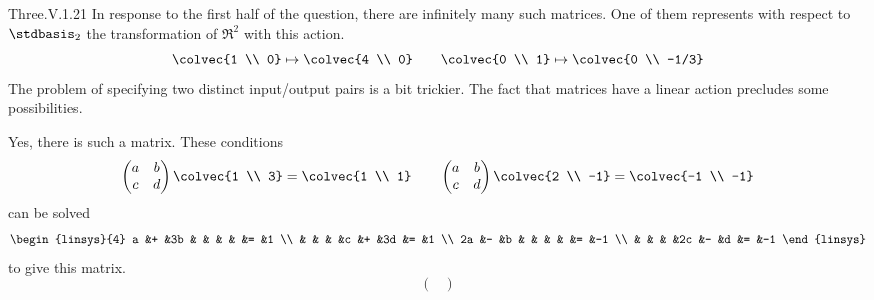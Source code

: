 \begin{ans}{Three.V.1.21}
      In response to the first half of the question,
      there are infinitely many such matrices.
      One of them  represents with respect to
      \( \stdbasis_2 \) the transformation of \( \Re^2 \) with this action.
      \begin{equation*}
        \colvec{1 \\ 0}\mapsto\colvec{4 \\ 0}
        \qquad
        \colvec{0 \\ 1}\mapsto\colvec{0 \\ -1/3}
      \end{equation*}
     The problem of specifying two distinct input/output pairs is a bit
     trickier.
     The fact that matrices have a linear action precludes some possibilities.
     \begin{exparts}
       \partsitem Yes, there is such a matrix.
         These conditions
         \begin{equation*}
           \begin{pmatrix}
             a  &b  \\
             c  &d
           \end{pmatrix}
           \colvec{1 \\ 3}
           =
           \colvec{1 \\ 1}
           \qquad
           \begin{pmatrix}
             a  &b  \\
             c  &d
           \end{pmatrix}
           \colvec{2 \\ -1}
           =
           \colvec{-1 \\ -1}
         \end{equation*}
         can be solved
         \begin{equation*}
           \begin{linsys}{4}
             a  &+  &3b  &   &   &   &   &=  &1  \\
                &   &    &   &c  &+  &3d &=  &1  \\
            2a  &-  &b   &   &   &   &   &=  &-1 \\
                &   &    &   &2c &-  &d  &=  &-1
           \end{linsys}
         \end{equation*}
         to give this matrix.
         \begin{equation*}
           \begin{pmatrix}

\end{pmatrix}
\end{equation*}
\end{exparts}
\end{ans}
